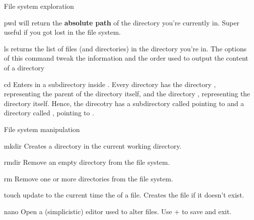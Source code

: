 \begin{frame}{File system exploration}

	\begin{block}{pwd}
		 will return the \textbf{absolute path} of the directory you're currently in. Super useful if you got lost in the file system.
	\end{block}
	
	\begin{block}{ls}
		returns the list of files (and directories) in the directory you're in. The options of this command tweak the information and the order used to output the content of a directory
	\end{block}
	
	\begin{block}{cd}
		Enters in a subdirectory inside . Every directory has the directory , representing the parent of the directory itself, and the directory , representing the directory itself. Hence, the direcotry  has a subdirectory called  pointing to  and a directory called , pointing to .
	\end{block}

\end{frame}

\begin{frame}{File system manipulation}

	\begin{block}{mkdir}
		Creates a directory in the current working directory.
	\end{block}
	
	\begin{block}{rmdir}
		Remove an empty directory from the file system.
	\end{block}
	
	\begin{block}{rm}
		Remove one or more directories from the file system.
	\end{block}
	
	\begin{block}{touch}
		update to the current time the  of a file. Creates the file if it doesn't exist.
	\end{block}
	
	\begin{block}{nano}
		Open a (simplicistic) editor used to alter files. Use  +  to save and exit.
	\end{block}

\end{frame}


